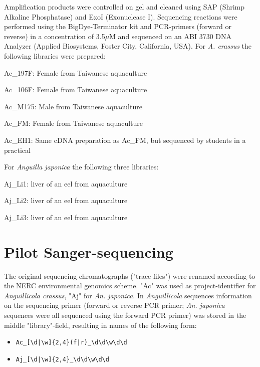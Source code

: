 Amplification products were controlled on gel and cleaned using SAP
(Shrimp Alkaline Phosphatase) and ExoI (Exonuclease I). Sequencing
reactions were performed using the BigDye-Terminator kit and
PCR-primers (forward or reverse) in a concentration of 3.5$\mu$M and
sequenced on an ABI 3730 DNA Analyzer (Applied Biosystems, Foster
City, California, USA).  For \textit{A. crassus} the following
libraries were prepared:
 
\begin{description}
\item{Ac\_197F:} Female from Taiwanese aquaculture
\item{Ac\_106F:} Female from Taiwanese aquaculture
\item{Ac\_M175:} Male from Taiwanese aquaculture
\item{Ac\_FM:} Female from Taiwanese aquaculture
\item{Ac\_EH1:} Same cDNA preparation as Ac\_FM, but sequenced by
  students in a practical
\end{description}

For \textit{Anguilla japonica} the following three libraries:
\begin{description}
\item{Aj\_Li1:} liver of an eel from aquaculture
\item{Aj\_Li2:} liver of an eel from aquaculture
\item{Aj\_Li3:} liver of an eel from aquaculture
\end{description}

\section{Pilot Sanger-sequencing}

The original sequencing-chromatographs ("trace-files") were renamed
according to the NERC environmental genomics scheme. "Ac" was used as
project-identifier for \textit{Anguillicola crassus}, "Aj" for
\textit{An. japonica}. In \textit{Anguillicola} sequences information
on the sequencing primer (forward or reverse PCR primer;
\textit{An. japonica} sequences were all sequenced using the forward
PCR primer) was stored in the middle "library"-field, resulting in
names of the following form:

\begin{itemize}
\item \texttt{Ac\_[\textbackslash{}d|\textbackslash{}w]\{2,4\}(f|r)\_\textbackslash{}d\textbackslash{}d\textbackslash{}w\textbackslash{}d\textbackslash{}d}
\item  \texttt{Aj\_[\textbackslash{}d|\textbackslash{}w]\{2,4\}\_\textbackslash{}d\textbackslash{}d\textbackslash{}w\textbackslash{}d\textbackslash{}d}
\end{itemize}

